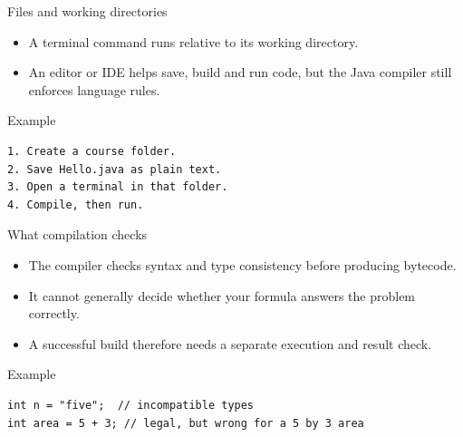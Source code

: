 \documentclass[10pt,aspectratio=169]{beamer}
\begin{document}
\begin{frame}[fragile,t]{Files and working directories}
\begin{itemize}
\item A terminal command runs relative to its working directory.
\item An editor or IDE helps save, build and run code, but the Java compiler still enforces language rules.
\end{itemize}
\vspace{1mm}\begin{block}{Example}
\begin{lstlisting}
1. Create a course folder.
2. Save Hello.java as plain text.
3. Open a terminal in that folder.
4. Compile, then run.
\end{lstlisting}
\end{block}
\end{frame}

\begin{frame}[fragile,t]{What compilation checks}
\begin{itemize}
\item The compiler checks syntax and type consistency before producing bytecode.
\item It cannot generally decide whether your formula answers the problem correctly.
\item A successful build therefore needs a separate execution and result check.
\end{itemize}
\vspace{1mm}\begin{block}{Example}
\begin{lstlisting}
int n = "five";  // incompatible types
int area = 5 + 3; // legal, but wrong for a 5 by 3 area
\end{lstlisting}
\end{block}
\end{frame}
\end{document}
